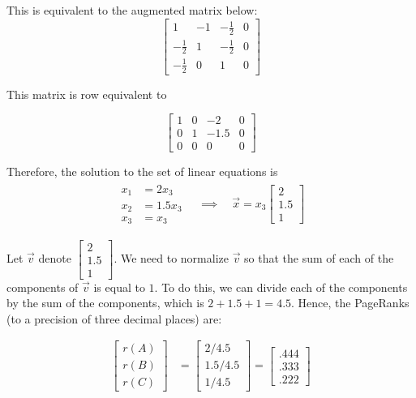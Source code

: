\documentclass{article}
\begin{document}
This is equivalent to the augmented matrix below:
\[
  \left[\begin{array}{rrr|r}
      1             & -1 & - \frac{1}{2} & 0 \\[1ex]
      - \frac{1}{2} & 1  & - \frac{1}{2} & 0 \\[1ex]
      - \frac{1}{2} & 0  & 1             & 0
    \end{array}\right]
\]

This matrix is row equivalent to

\[
  \left[\begin{array}{rrr|r}
      1 & 0 & -2   & 0 \\[1ex]
      0 & 1 & -1.5 & 0 \\[1ex]
      0 & 0 & 0    & 0
    \end{array}\right]
\]

Therefore, the solution to the set of linear equations is
\begin{align*}
  \begin{aligned}
    x_1 & = 2x_3   \\
    x_2 & = 1.5x_3 \\
    x_3 & = x_3
  \end{aligned}
  \quad \implies \quad
  \vec{x} = x_3 \begin{bmatrix}
                  2   \\
                  1.5 \\
                  1
                \end{bmatrix}
\end{align*}

Let $\vec{v}$ denote $\begin{bmatrix}
    2   \\
    1.5 \\
    1
  \end{bmatrix}$. We need to normalize $\vec{v}$ so that the sum of each of the components of $\vec{v}$ is equal to $1$. To do this, we can divide each of the components by the sum of the components, which is $2 + 1.5 + 1 = 4.5$. Hence, the PageRanks (to a precision of three decimal places) are:

\begin{align*}
  \begin{bmatrix}
    r(A) \\
    r(B) \\
    r(C)
  \end{bmatrix} & = \begin{bmatrix}
                      2/4.5   \\[1ex]
                      1.5/4.5 \\[1ex]
                      1/4.5
                    \end{bmatrix} = \begin{bmatrix}
                                      .444 \\
                                      .333 \\
                                      .222
                                    \end{bmatrix} \\
\end{align*}
\end{document}
